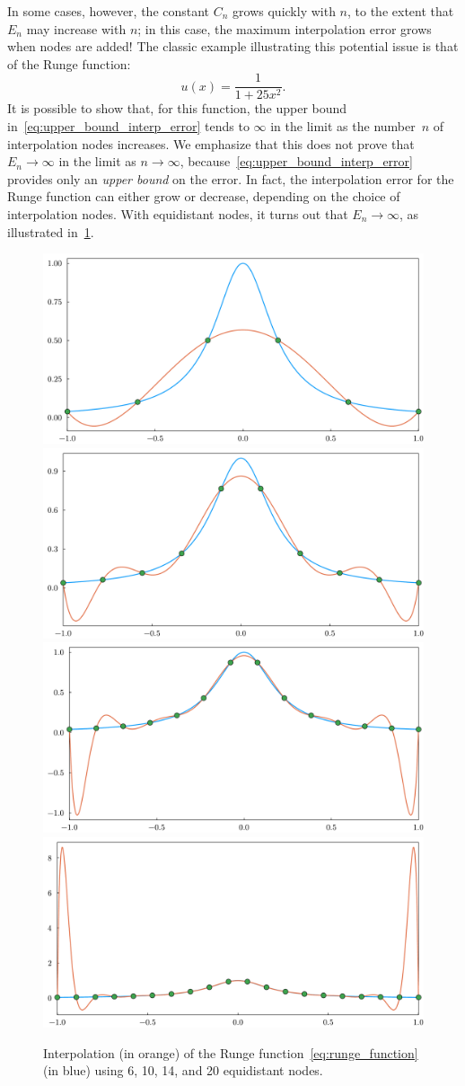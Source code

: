 In some cases, however,
the constant $C_n$ grows quickly with $n$,
to the extent that $E_n$ may increase with $n$;
in this case, the maximum interpolation error grows when nodes are added!
The classic example illustrating this potential issue is that of the Runge function:
\begin{equation}
    \label{eq:runge_function}
    u(x) = \frac{1}{1 + 25 x^2}.
\end{equation}
It is possible to show that,
for this function,
the upper bound in~\eqref{eq:upper_bound_interp_error} tends to $\infty$ in the limit as the number~$n$ of interpolation nodes increases.
We emphasize that this does not prove that~$E_n \to \infty$ in the limit as $n \to \infty$,
because~\eqref{eq:upper_bound_interp_error} provides only an \emph{upper bound} on the error.
In fact, the interpolation error for the Runge function can either grow or decrease,
depending on the choice of interpolation nodes.
With equidistant nodes, it turns out that $E_n \to \infty$,
as illustrated in~\cref{fig:interpolation_runge_function}.
\begin{figure}[ht!]
    \centering
    \includegraphics[width=0.49\linewidth]{figures/interpolation_runge_6.pdf}
    \includegraphics[width=0.49\linewidth]{figures/interpolation_runge_10.pdf}
    \includegraphics[width=0.49\linewidth]{figures/interpolation_runge_14.pdf}
    \includegraphics[width=0.49\linewidth]{figures/interpolation_runge_20.pdf}
    \caption{Interpolation (in orange) of the Runge function~\eqref{eq:runge_function} (in blue) using 6, 10, 14, and 20 equidistant nodes.}%
    \label{fig:interpolation_runge_function}
\end{figure}

